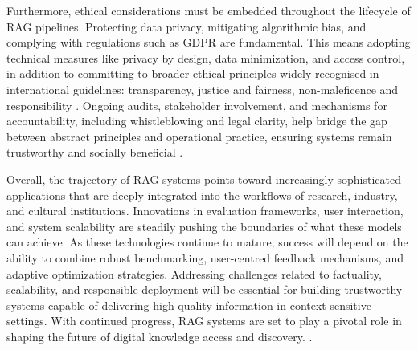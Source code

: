 \begin{spacing}{1.5}
Furthermore, ethical considerations must be embedded throughout the lifecycle of RAG pipelines. Protecting data privacy, mitigating algorithmic bias, and complying with regulations such as GDPR are fundamental. This means adopting technical measures like privacy by design, data minimization, and access control, in addition to committing to broader ethical principles widely recognised in international guidelines: transparency, justice and fairness, non-maleficence and responsibility \citep{jobin_global_2019}. Ongoing audits, stakeholder involvement, and mechanisms for accountability, including whistleblowing and legal clarity, help bridge the gap between abstract principles and operational practice, ensuring systems remain trustworthy and socially beneficial \citep{ashery_emergent_2025}.

Overall, the trajectory of RAG systems points toward increasingly sophisticated applications that are deeply integrated into the workflows of research, industry, and cultural institutions. Innovations in evaluation frameworks, user interaction, and system scalability are steadily pushing the boundaries of what these models can achieve. As these technologies continue to mature, success will depend on the ability to combine robust benchmarking, user-centred feedback mechanisms, and adaptive optimization strategies. Addressing challenges related to factuality, scalability, and responsible deployment will be essential for building trustworthy systems capable of delivering high-quality information in context-sensitive settings. With continued progress, RAG systems are set to play a pivotal role in shaping the future of digital knowledge access and discovery. \parencite{zaib_conversational_2022,wang_searching_2024, gao_retrieval-augmented_2024}.


\end{spacing}
